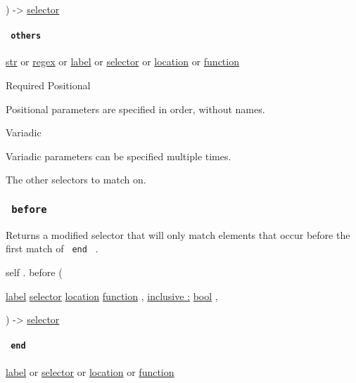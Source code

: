 ) -\textgreater{} \href{/docs/reference/foundations/selector/}{selector}

\paragraph{\texorpdfstring{\texttt{\ others\ }}{ others }}\label{definitions-and-others}

\href{/docs/reference/foundations/str/}{str} {or}
\href{/docs/reference/foundations/regex/}{regex} {or}
\href{/docs/reference/foundations/label/}{label} {or}
\href{/docs/reference/foundations/selector/}{selector} {or}
\href{/docs/reference/introspection/location/}{location} {or}
\href{/docs/reference/foundations/function/}{function}

{Required} {{ Positional }}

\label{definitions-and-others-positional-tooltip}
Positional parameters are specified in order, without names.

{{ Variadic }}

\label{definitions-and-others-variadic-tooltip}
Variadic parameters can be specified multiple times.

The other selectors to match on.

\subsubsection{\texorpdfstring{\texttt{\ before\ }}{ before }}\label{definitions-before}

Returns a modified selector that will only match elements that occur
before the first match of \texttt{\ end\ } .

self { . } { before } (

{ \href{/docs/reference/foundations/label/}{label}
\href{/docs/reference/foundations/selector/}{selector}
\href{/docs/reference/introspection/location/}{location}
\href{/docs/reference/foundations/function/}{function} , } {
\hyperref[definitions-before-parameters-inclusive]{inclusive :}
\href{/docs/reference/foundations/bool/}{bool} , }

) -\textgreater{} \href{/docs/reference/foundations/selector/}{selector}

\paragraph{\texorpdfstring{\texttt{\ end\ }}{ end }}\label{definitions-before-end}

\href{/docs/reference/foundations/label/}{label} {or}
\href{/docs/reference/foundations/selector/}{selector} {or}
\href{/docs/reference/introspection/location/}{location} {or}
\href{/docs/reference/foundations/function/}{function}

